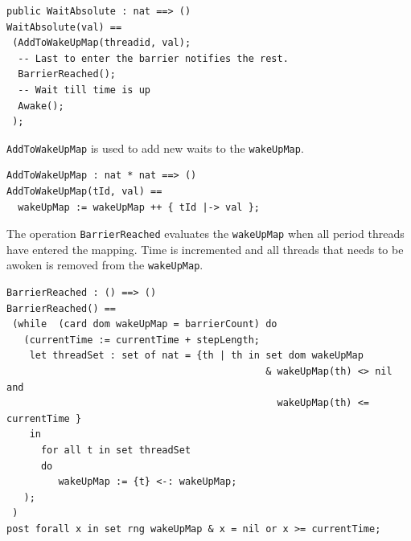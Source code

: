\documentclass{overturerepchap}
\begin{document}
\begin{lstlisting}
public WaitAbsolute : nat ==> ()
WaitAbsolute(val) ==
 (AddToWakeUpMap(threadid, val);
  -- Last to enter the barrier notifies the rest.
  BarrierReached();
  -- Wait till time is up
  Awake();
 );
\end{lstlisting}

\texttt{AddToWakeUpMap} is used to add new waits to the \texttt{wakeUpMap}.

\begin{lstlisting}
AddToWakeUpMap : nat * nat ==> ()
AddToWakeUpMap(tId, val) ==
  wakeUpMap := wakeUpMap ++ { tId |-> val };
\end{lstlisting}

The operation \texttt{BarrierReached} evaluates the \texttt{wakeUpMap} when 
all period threads have entered the mapping. Time is incremented and all threads
that needs to be awoken is removed from the \texttt{wakeUpMap}.

\begin{lstlisting}
BarrierReached : () ==> ()
BarrierReached() == 
 (while  (card dom wakeUpMap = barrierCount) do
   (currentTime := currentTime + stepLength;
    let threadSet : set of nat = {th | th in set dom wakeUpMap 
                                             & wakeUpMap(th) <> nil and 
                                               wakeUpMap(th) <= currentTime }
    in
      for all t in set threadSet 
      do
         wakeUpMap := {t} <-: wakeUpMap;
   );
 )
post forall x in set rng wakeUpMap & x = nil or x >= currentTime;
\end{lstlisting}

%
%
%
%
%
\end{document}
